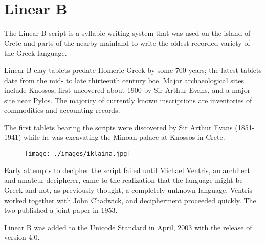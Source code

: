 
\section{Linear B}
\label{s:linearb}

The Linear B script is a syllabic writing system that was used on the island of Crete and
parts of the nearby mainland to write the oldest recorded variety of the Greek language.

Linear B clay tablets predate Homeric Greek by some 700 years; the latest tablets date from
the mid- to late thirteenth century bce. Major archaeological sites include Knossos, first
uncovered about 1900 by Sir Arthur Evans, and a major site near Pylos. The majority of
currently known inscriptions are inventories of commodities and accounting records.

The first tablets bearing the scripts were discovered by Sir Arthur Evans (1851-1941) while he was excavating the Minoan palace at Knossos in Crete. 


\medskip

\begin{figure}[ht]
\centering
\begin{minipage}{5cm}
\texttt{[image: ./images/iklaina.jpg]}
\end{minipage}\hspace{2em}
\begin{minipage}{7cm}
\end{minipage}

\end{figure}


Early attempts to decipher the script failed until Michael Ventris, an architect and amateur
decipherer, came to the realization that the language might be Greek and not, as previously
thought, a completely unknown language. Ventris worked together with John Chadwick,
and decipherment proceeded quickly. The two published a joint paper in 1953.\citep{ventrisa}


\newfontfamily{}

Linear B was added to the Unicode Standard in April, 2003 with the release of version 4.0.

